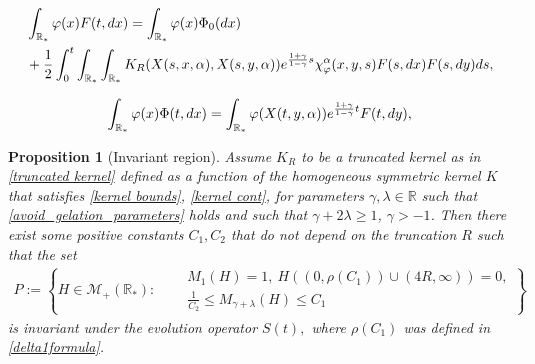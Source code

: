 \documentclass[10pt,a4paper]{amsart}
\newtheorem{proposition}{Proposition}
\newcommand{\der}{\textup{d}}
\begin{document}
\begin{align} 
&\int_{\mathbb R_*} \varphi(x) F(t,  \der x) =  \int_{\mathbb R_*} \varphi(x) \Phi_0( \der x)  \\
&+ \frac{1}{2} \int_0^t \int_{\mathbb R_*} \int_{\mathbb R_*} K_R(X(s,x, \alpha),X(s,y,\alpha))e^{\frac{1+\gamma}{1-\gamma}s}\chi^\alpha_{\varphi}(x,y,s)F(s,  \der x) F(s,  \der y) \der s, \nonumber
\end{align}

\begin{align}\label{phi function of F}
\int_{\mathbb R_*} \varphi(x) \Phi(t, \der x)=\int_{\mathbb R_*} \varphi(X(t,y, \alpha))  e^{\frac{1+\gamma}{1-\gamma }t} F(t, \der y),
\end{align} 

\begin{proposition}[Invariant region] \label{prop:inv region}
Assume $K_R $ to be a truncated kernel as in \eqref{truncated kernel} defined as a function of the homogeneous symmetric kernel $K$ that satisfies \eqref{kernel bounds},  \eqref{kernel cont},  for parameters $\gamma, \lambda \in \mathbb R$ such that \eqref{avoid_gelation_parameters} holds and such that $\gamma + 2\lambda \geq  1$, $\gamma >-1 $. Then there exist some positive constants $C_1, C_2$ that do not depend on the truncation $R$ such that the set
\begin{align} \label{invariant region}
P:=\left\{ 
H \in \mathcal M_{+}(\mathbb R_*) : \quad \begin{aligned}   & M_1(H )=1,\ 
H((0, \rho(C_1)) \cup (4R,\infty) )=0, \\
& \frac{1}{C_{2}} \leq M_{\gamma + \lambda}(H) \leq C_1
 \end{aligned} 
 \right\}
\end{align} 
is invariant under the evolution operator $S(t),$ where $\rho(C_1)$ was defined in \eqref{delta1formula}. 
\end{proposition}
\end{document}
